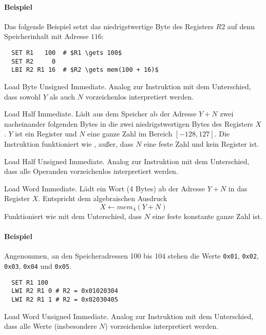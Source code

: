 \paragraph{Beispiel}
Das folgende Beispiel setzt das niedrigstwertige Byte des Registers $R2$ auf
denn Speicherinhalt mit Adresse $116$:

\begin{lstlisting}
  SET R1   100  # $R1 \gets 100$
  SET R2     0
  LBI R2 R1 16  # $R2 \gets mem(100 + 16)$
\end{lstlisting}




\glqq Load Byte Unsigned Immediate\grqq.
Analog zur Instruktion  mit dem Unterschied, dass sowohl $Y$ als auch
$N$ vorzeichenlos interpretiert werden.



\glqq Load Half Immediate\grqq.
Lädt aus dem Speicher ab der Adresse $Y + N$ zwei nacheinander folgenden Bytes
in die zwei niedrigstwertigen Bytes des Registers $X$.
$Y$ ist ein Register und $N$ eine ganze Zahl im Bereich $[-128, 127]$.
Die Instruktion funktioniert wie , außer, dass $N$ eine feste Zahl und
kein Register ist.


\glqq Load Half Unsigned Immediate\grqq.
Analog zur Instruktion  mit dem Unterschied, dass alle Operanden
vorzeichenlos interpretiert werden.


\glqq Load Word Immediate\grqq.
Lädt ein Wort (4 Bytes) ab der Adresse $Y + N$ in das Register $X$. Entspricht
dem algebraischen Ausdruck
\[
    X \gets mem_{4}(Y + N)
\]
Funktioniert wie  mit dem Unterschied, dass $N$ eine feste konstante
ganze Zahl ist.

\paragraph{Beispiel}
Angenommen, an den Speicheradressen 100 bis 104 stehen die Werte \texttt{0x01},
\texttt{0x02}, \texttt{0x03}, \texttt{0x04} und \texttt{0x05}.
\begin{lstlisting}
  SET R1 100
  LWI R2 R1 0 # R2 = 0x01020304
  LWI R2 R1 1 # R2 = 0x02030405
\end{lstlisting}


\glqq Load Word Unsigned Immediate\grqq.
Analog zur Instruktion  mit dem Unterschied, dass alle Werte
(insbesondere $N$) vorzeichenlos interpretiert werden.



